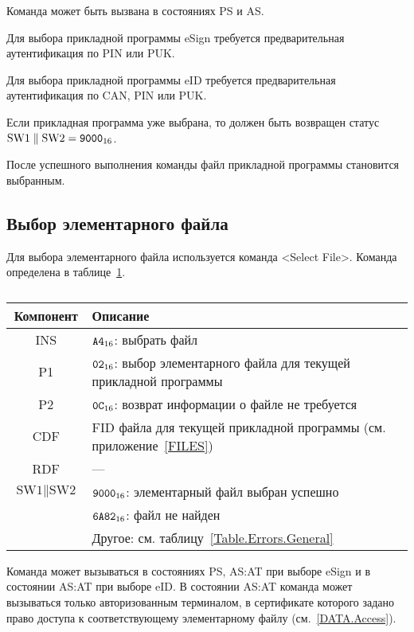Команда может быть вызвана в состояниях PS и AS.

Для выбора прикладной программы eSign требуется
предварительная аутентификация по PIN или PUK.

Для выбора прикладной программы eID требуется
предварительная аутентификация по CAN, PIN или PUK.

Если прикладная программа уже выбрана, то должен быть возвращен
статус $\text{SW1} \parallel \text{SW2} = \texttt{9000}_{16}$.

После успешного выполнения команды файл прикладной программы 
становится выбранным.

\subsection{Выбор элементарного файла}
\label{Oper.Descr.SelectEF}

Для выбора элементарного файла используется команда <Select File>. 
Команда определена в таблице~\ref{Table.Oper.SelectEFCmd}.

\begin{table}[hbt]
\caption{}\label{Table.Oper.SelectEFCmd}
\begin{tabular}{|c|p{14cm}|}
\hline
Компонент & Описание \\
\hline
\hline
INS & $\texttt{A4}_{16}$: выбрать файл\\ 
\hline
P1 & $\texttt{02}_{16}$: выбор элементарного файла для текущей прикладной программы\\
\hline
P2 & $\texttt{0C}_{16}$: возврат информации о файле не требуется \\
\hline
CDF & FID файла для текущей прикладной программы (см. приложение~\ref{FILES})\\
\hline 
RDF &  --- \\
\hline
$\text{SW1}\parallel\text{SW2}$ & 
$\texttt{9000}_{16}$: элементарный файл выбран успешно \\
\cline{2-2}
  & $\texttt{6A82}_{16}$: файл не найден \\
\cline{2-2}
  & Другое: см. таблицу~\ref{Table.Errors.General}\\
\hline
\end{tabular}
\end{table}

Команда может вызываться в состояниях PS, AS:AT 
при выборе eSign и в состоянии AS:AT при выборе eID. 
В состоянии AS:AT команда может вызываться только 
авторизованным терминалом, в сертификате которого
задано право доступа к соответствующему элементарному файлу 
(см.~\ref{DATA.Access}).


